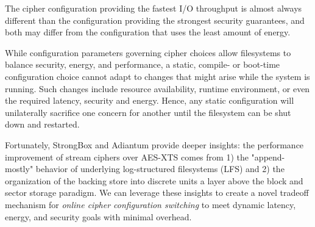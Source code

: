 The cipher configuration providing the fastest I/O throughput is almost always
different than the configuration providing the strongest security guarantees,
and both may differ from the configuration that uses the least amount of energy.

While configuration parameters governing cipher choices allow filesystems to
balance security, energy, and performance, a static,  compile- or boot-time
configuration choice cannot adapt to changes that might arise while the system
is running.  Such changes include resource availability, runtime environment, or
even the required latency, security and energy. Hence, any static configuration
will unilaterally sacrifice one concern for another until the filesystem can be
shut down and restarted.

Fortunately, StrongBox and Adiantum provide deeper insights: the performance
improvement of stream ciphers over AES-XTS comes from 1) the "append-mostly"
behavior of underlying log-structured filesystems (LFS) and 2) the organization
of the backing store into discrete units a layer above the block and sector
storage paradigm. We can leverage these insights to create a novel tradeoff
mechanism for \emph{online cipher configuration switching} to meet dynamic
latency, energy, and security goals with minimal overhead.


